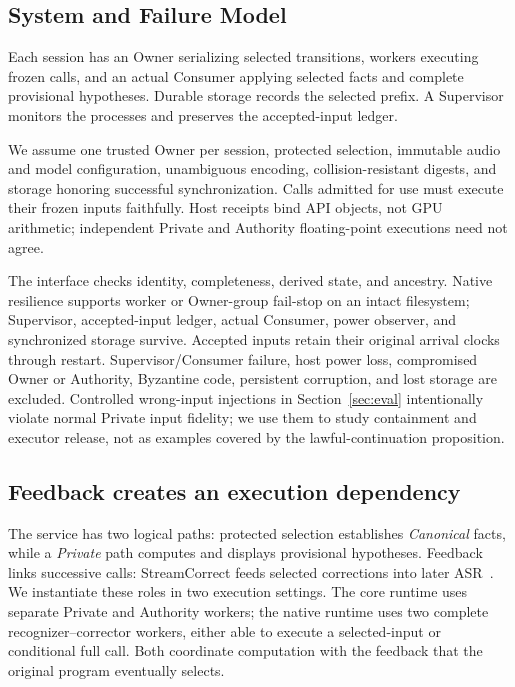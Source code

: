 \subsection{System and Failure Model}\label{subsec:failure_model}
Each session has an Owner serializing selected transitions, workers
executing frozen calls, and an actual Consumer applying selected facts
and complete provisional hypotheses. Durable storage records the
selected prefix. A Supervisor monitors the processes and preserves the
accepted-input ledger.

We assume one trusted Owner per session, protected selection, immutable
audio and model configuration, unambiguous encoding, collision-resistant
digests, and storage honoring successful synchronization. Calls admitted
for use must execute their frozen inputs faithfully. Host receipts bind API objects,
not GPU arithmetic; independent Private and Authority floating-point
executions need not agree.

The interface checks identity, completeness, derived state, and ancestry.
Native resilience supports worker or Owner-group fail-stop on an intact
filesystem; Supervisor, accepted-input ledger, actual Consumer, power
observer, and synchronized storage survive. Accepted inputs retain their
original arrival clocks through restart. Supervisor/Consumer failure, host power loss,
compromised Owner or Authority, Byzantine code, persistent corruption,
and lost storage are excluded. Controlled wrong-input injections in
Section~\ref{sec:eval} intentionally violate normal Private input fidelity;
we use them to study containment and executor release, not as examples
covered by the lawful-continuation proposition.

\subsection{Feedback creates an execution dependency}
The service has two logical paths: protected selection establishes
\emph{Canonical} facts, while a \emph{Private} path computes and displays
provisional hypotheses. Feedback links successive calls: StreamCorrect
feeds selected corrections into later ASR~\cite{vu2026streamcorrect}.
We instantiate these roles in two execution settings. The core runtime
uses separate Private and Authority workers; the native runtime uses two
complete recognizer--corrector workers, either able to execute a
selected-input or conditional full call. Both coordinate computation with
the feedback that the original program eventually selects.

